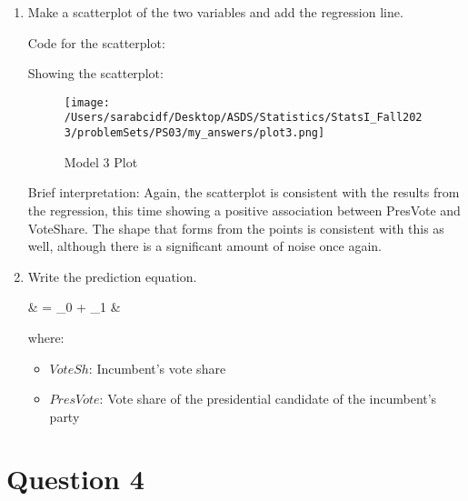\documentclass[12pt,letterpaper]{article}
\begin{document}
\begin{enumerate}
		\item Make a scatterplot of the two variables and add the regression line. \vspace{.25cm}
		
		Code for the scatterplot: 
		
		
		Showing the scatterplot: 
		\begin{figure}[H]
			\centering
			\texttt{[image: /Users/sarabcidf/Desktop/ASDS/Statistics/StatsI\_Fall2023/problemSets/PS03/my\_answers/plot3.png]}
			\caption{Model 3 Plot}
		\end{figure}
		
		Brief interpretation: 
		Again, the scatterplot is consistent with the results from the regression, this time showing a positive association between PresVote and VoteShare. The shape that forms from the points is consistent with this as well, although there is a significant amount of noise once again. 
			
		\item Write the prediction equation.
		
		{\setlength{\abovedisplayskip}{2pt} 
			\setlength{\belowdisplayskip}{6pt} 
			
			\begin{flalign*}
				& = \beta_0 + \beta_1 \cdot {}  &
			\end{flalign*}
			
			where: 
			
			\begin{itemize}
				\item $VoteSh$: Incumbent's vote share
				\item $PresVote$: Vote share of the presidential candidate of the incumbent's party
			\end{itemize}
		}
		
	\end{enumerate}
	

\newpage	
\section*{Question 4}
\end{document}
